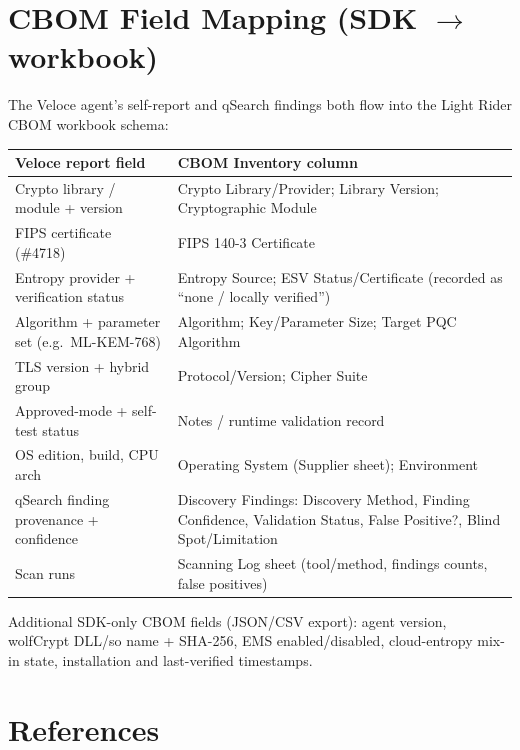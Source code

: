 \documentclass[10pt]{article}
\begin{document}
\section{CBOM Field Mapping (SDK $\rightarrow$ workbook)}\label{app:cbom}

The Veloce agent's self-report and qSearch findings both flow into the Light Rider CBOM
workbook schema:

\begin{small}
\begin{tabularx}{\textwidth}{@{}lL@{}}
\toprule
\textbf{Veloce report field} & \textbf{CBOM Inventory column} \\
\midrule
Crypto library / module + version & Crypto Library/Provider; Library Version;
  Cryptographic Module \\
FIPS certificate (\#4718) & FIPS 140-3 Certificate \\
Entropy provider + verification status & Entropy Source; ESV Status/Certificate
  (recorded as ``none / locally verified'') \\
Algorithm + parameter set (e.g.\ ML-KEM-768) & Algorithm; Key/Parameter Size;
  Target PQC Algorithm \\
TLS version + hybrid group & Protocol/Version; Cipher Suite \\
Approved-mode + self-test status & Notes / runtime validation record \\
OS edition, build, CPU arch & Operating System (Supplier sheet); Environment \\
qSearch finding provenance + confidence & Discovery Findings: Discovery Method, Finding
  Confidence, Validation Status, False Positive?, Blind Spot/Limitation \\
Scan runs & Scanning Log sheet (tool/method, findings counts, false positives) \\
\bottomrule
\end{tabularx}
\end{small}

Additional SDK-only CBOM fields (JSON/CSV export): agent version, wolfCrypt DLL/so name +
SHA-256, EMS enabled/disabled, cloud-entropy mix-in state, installation and last-verified
timestamps.

\section{References}\label{app:refs}
\end{document}
